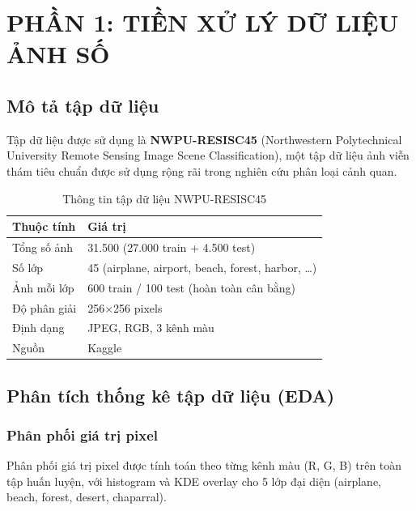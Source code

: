\documentclass[12pt,a4paper]{article}
\let\oldtextbf\textbf
\renewcommand{\textbf}[1]{\oldtextbf{\textcolor{hcmublue}{#1}}}
\begin{document}
\section{PHẦN 1: TIỀN XỬ LÝ DỮ LIỆU ẢNH SỐ}

\subsection{Mô tả tập dữ liệu}

Tập dữ liệu được sử dụng là \textbf{NWPU-RESISC45} (Northwestern Polytechnical University Remote Sensing Image Scene Classification), một tập dữ liệu ảnh viễn thám tiêu chuẩn được sử dụng rộng rãi trong nghiên cứu phân loại cảnh quan.

\begin{table}[H]
\centering
\begin{tabular}{|l|l|}
\hline
\textbf{Thuộc tính} & \textbf{Giá trị} \\ \hline
Tổng số ảnh & 31.500 (27.000 train + 4.500 test) \\ \hline
Số lớp & 45 (airplane, airport, beach, forest, harbor, \ldots) \\ \hline
Ảnh mỗi lớp & 600 train / 100 test (hoàn toàn cân bằng) \\ \hline
Độ phân giải & 256$\times$256 pixels \\ \hline
Định dạng & JPEG, RGB, 3 kênh màu \\ \hline
Nguồn & Kaggle \\ \hline
\end{tabular}
\caption{Thông tin tập dữ liệu NWPU-RESISC45}
\label{tab:img_dataset}
\end{table}

\subsection{Phân tích thống kê tập dữ liệu (EDA)}

\subsubsection{Phân phối giá trị pixel}

Phân phối giá trị pixel được tính toán theo từng kênh màu (R, G, B) trên toàn tập huấn luyện, với histogram và KDE overlay cho 5 lớp đại diện (airplane, beach, forest, desert, chaparral).
\end{document}

